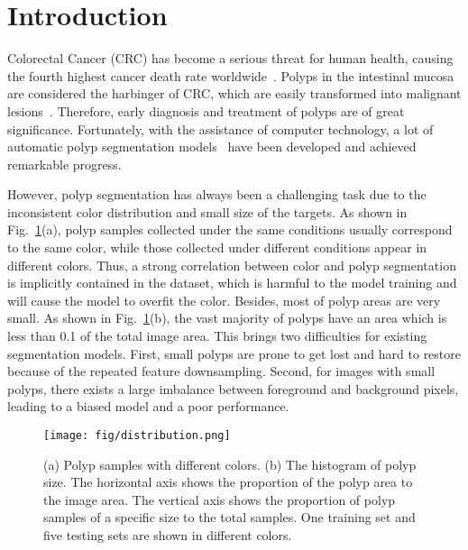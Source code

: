 \documentclass[runningheads]{llncs}
\begin{document}
\section{Introduction}
\label{introduction}
Colorectal Cancer (CRC) has become a serious threat for human health, causing the fourth highest cancer death rate worldwide~\cite{favoriti2016worldwide}. Polyps in the intestinal mucosa are considered the harbinger of CRC, which are easily transformed into malignant lesions~\cite{granados2017colorectal}. Therefore, early diagnosis and treatment of polyps are of great significance. Fortunately, with the assistance of computer technology, a lot of automatic polyp segmentation models~\cite{akbari2018polyp,brandao2017fully,fan2020pranet,fang2019selective,mamonov2014automated,ronneberger2015u,tajbakhsh2015automated,zhang2020adaptive,zhang2018road,zhou2018unet++} have been developed and achieved remarkable progress.

However, polyp segmentation has always been a challenging task due to the inconsistent color distribution and small size of the targets. As shown in Fig.~\ref{fig:distribution}(a), polyp samples collected under the same conditions usually correspond to the same color, while those collected under different conditions appear in different colors. Thus, a strong correlation between color and polyp segmentation is implicitly contained in the dataset, which is harmful to the model training and will cause the model to overfit the color.
Besides, most of polyp areas are very small. As shown in Fig.~\ref{fig:distribution}(b), the vast majority of polyps have an area which is less than 0.1 of the total image area. This brings two difficulties for existing segmentation models. First, small polyps are prone to get lost and hard to restore because of the repeated feature downsampling. Second, for images with small polyps, there exists a large imbalance between foreground and background pixels, leading to a biased model and a poor performance. 

\begin{figure}[t]
  \centering
  \texttt{[image: fig/distribution.png]}
  \caption{(a) Polyp samples with different colors. (b) The histogram of polyp size. The horizontal axis shows the proportion of the polyp area to the image area. The vertical axis shows the proportion of polyp samples of a specific size to the total samples. One training set and five testing sets are shown in different colors.}
  \label{fig:distribution}
\end{figure}
\end{document}
